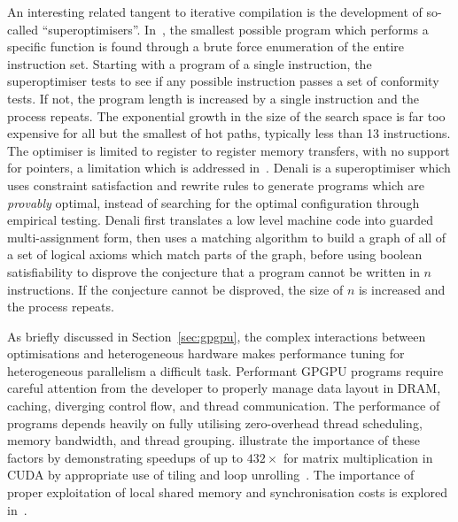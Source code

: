An interesting related tangent to iterative compilation is the
development of so-called ``superoptimisers''. In~\cite{Massalin1987},
the smallest possible program which performs a specific function is
found through a brute force enumeration of the entire instruction
set. Starting with a program of a single instruction, the
superoptimiser tests to see if any possible instruction passes a set
of conformity tests. If not, the program length is increased by a
single instruction and the process repeats. The exponential growth in
the size of the search space is far too expensive for all but the
smallest of hot paths, typically less than 13 instructions. The
optimiser is limited to register to register memory transfers, with no
support for pointers, a limitation which is addressed
in~\cite{Joshi2002}. Denali is a superoptimiser which uses constraint
satisfaction and rewrite rules to generate programs which are
\emph{provably} optimal, instead of searching for the optimal
configuration through empirical testing. Denali first translates a low
level machine code into guarded multi-assignment form, then uses a
matching algorithm to build a graph of all of a set of logical axioms
which match parts of the graph, before using boolean satisfiability to
disprove the conjecture that a program cannot be written in $n$
instructions. If the conjecture cannot be disproved, the size of $n$
is increased and the process repeats.



As briefly discussed in Section~\ref{sec:gpgpu}, the complex
interactions between optimisations and heterogeneous hardware makes
performance tuning for heterogeneous parallelism a difficult
task. Performant GPGPU programs require careful attention from the
developer to properly manage data layout in DRAM, caching, diverging
control flow, and thread communication. The performance of programs
depends heavily on fully utilising zero-overhead thread scheduling,
memory bandwidth, and thread grouping. \citeauthor{Ryoo2008a}
illustrate the importance of these factors by demonstrating speedups
of up to $432\times$ for matrix multiplication in CUDA by appropriate
use of tiling and loop unrolling~\cite{Ryoo2008a}. The importance of
proper exploitation of local shared memory and synchronisation costs
is explored in~\cite{Lee2010}.

